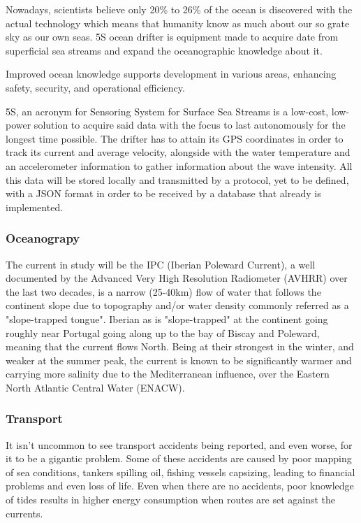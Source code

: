 Nowadays, scientists believe only 20\% to 26\% of the ocean is discovered with the actual technology which means that humanity 
know as much about our so grate sky as our own seas. 5S ocean drifter is equipment made to acquire date from 
superficial sea streams and expand the oceanographic knowledge about it.

Improved ocean knowledge supports development in various areas, enhancing safety, security, and operational efficiency.

5S, an acronym for Sensoring System for Surface Sea Streams is a low-cost, low-power solution to acquire
said data with the focus to last autonomously for the longest time possible. The drifter has to attain its GPS
coordinates in order to track its current and average velocity, alongside with the water temperature and an accelerometer 
information to gather information about the wave intensity. All this data will be stored locally and transmitted by a protocol,
yet to be defined, with a JSON format in order to be received by a database that already is implemented.  


\subsubsection{Oceanograpy}
\label{sec:Oceanograpy}
The current in study will be the IPC (Iberian Poleward Current), a well documented by the Advanced Very High Resolution Radiometer (AVHRR)
over the last two decades, is a narrow (25-40km) flow of water that follows the continent slope due to topography and/or water density
commonly referred as a "slope-trapped tongue". Iberian as is "slope-trapped" at the continent going roughly near Portugal going along 
up to the bay of Biscay and Poleward, meaning that the current flows North. Being at their strongest in the winter, and weaker at the summer
peak, the current is known to be significantly warmer and carrying more salinity due to the Mediterranean influence, over the 
Eastern North Atlantic Central Water (ENACW).

\subsubsection{Transport}
It isn't uncommon to see transport accidents being reported, and even worse, for it to be a gigantic problem.
Some of these accidents are caused by poor mapping of sea conditions, tankers spilling oil, fishing vessels capsizing, leading
to financial problems and even loss of life. Even when there are no accidents, poor knowledge of tides results in higher energy consumption when routes are set against the currents.

